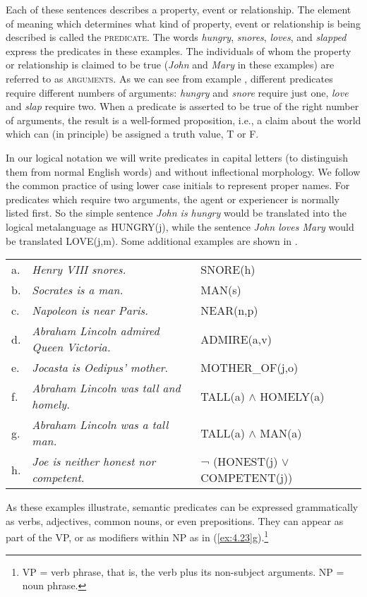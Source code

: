 Each of these sentences describes a property, event or relationship. The element of meaning which determines what kind of property, event or relationship is being described is called the \textsc{predicate}. The words \textit{hungry}, \textit{snores}, \textit{loves}, and \textit{slapped} express the predicates in these examples. The individuals of whom the property or relationship is claimed to be true (\textit{John} and \textit{Mary} in these examples) are referred to as \textsc{arguments}. As we can see from example , different predicates require different numbers of arguments: \textit{hungry} and \textit{snore} require just one, \textit{love} and \textit{slap} require two. When a predicate is asserted to be true of the right number of arguments, the result is a well-formed proposition, i.e., a claim about the world which can (in principle) be assigned a truth value, T or F.



In our logical notation we will write predicates in capital letters (to distinguish them from normal English words) and without inflectional morphology. We follow the common practice of using lower case initials to represent proper names. For predicates which require two arguments, the agent or experiencer is normally listed first. So the simple sentence \textit{John is hungry} would be translated into the logical metalanguage as HUNGRY(j), while the sentence \textit{John loves Mary} would be translated LOVE(j,m). Some additional examples are shown in .


\ea\label{ex:4.23}
\begin{tabular}[t]{@{}lll}
a. & \textit{Henry VIII snores.} & SNORE(h)\\
b. & \textit{Socrates is a man.} & MAN(s)\\
c. & \textit{Napoleon is near Paris.} & NEAR(n,p)\\
d. & \textit{Abraham Lincoln admired Queen Victoria.} & ADMIRE(a,v)\\
e. & \textit{Jocasta is Oedipus’ mother}. & MOTHER\_OF(j,o)\\
f. & \textit{Abraham Lincoln was tall and homely.} & TALL(a) $\wedge$ HOMELY(a)\\
g. & \textit{Abraham Lincoln was a tall man.}  & TALL(a) $\wedge$ MAN(a)\\
h. & \textit{Joe is neither honest nor competent}. & ¬ (HONEST(j) $\vee$ COMPETENT(j))
\end{tabular}
\z


As these examples illustrate, semantic predicates can be expressed grammatically as verbs, adjectives, common nouns, or even prepositions. They can appear as part of the VP, or as modifiers within NP as in (\ref{ex:4.23}g).\footnote{VP = verb phrase, that is, the verb plus its non-subject arguments. NP = noun phrase.}



